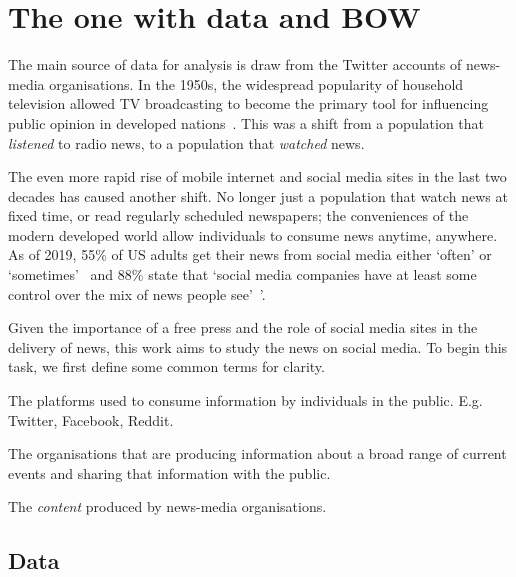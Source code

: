 \chapter{The one with data and BOW\label{ch:dataandBOW}}

The main source of data for analysis is draw from the Twitter accounts of news-media organisations. In the 1950s, the widespread popularity of household television allowed TV broadcasting to become the primary tool for influencing public opinion in developed nations~.  This was a shift from a population that \emph{listened} to radio news, to a population that \emph{watched} news. 

The even more rapid rise of mobile internet and social media sites in the last two decades has caused another shift. No longer just a population that watch news at fixed time, or read regularly scheduled newspapers; the conveniences of the modern developed world allow individuals to consume news anytime, anywhere. As of 2019, 55\% of US adults get their news from social media either `often' or `sometimes'~ and 88\% state that `social media companies have at least some control over the mix of news people see'~'\cite{shearerAmericansAreWary2019}.

Given the importance of a free press and the role of social media sites in the delivery of news, this work aims to study the news on social media. To begin this task, we first define some common terms for clarity.

\begin{definition}
	The platforms used to consume information by individuals in the public. E.g. Twitter, Facebook, Reddit.
\end{definition}

\begin{definition}
	The organisations that are producing information about a broad range of current events and sharing that information with the public.
\end{definition}

\begin{definition}[News]
	The \emph{content} produced by news-media organisations. 
\end{definition}

\section{Data}


